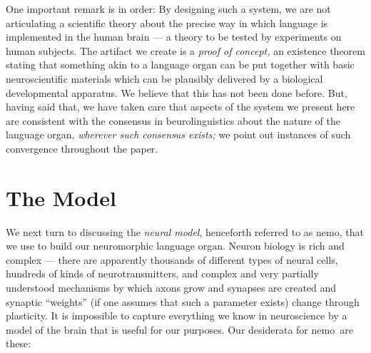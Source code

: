 \documentclass{article}
\begin{document}
One important remark is in order:  By designing such a system, we are not articulating a scientific theory about the precise way in which language is implemented in the human brain --- a theory to be tested by experiments on human subjects.  The artifact we create is a \emph{proof of concept,} an existence theorem stating that something akin to a language organ can be put together with basic neuroscientific materials which can be plausibly delivered by a biological developmental apparatus.  We believe that this has not been done before.  But, having said that, we have taken care that aspects of the system we present here are consistent with the consensus in beurolinguistics about the nature of the language organ, \emph{wherever such consensus exists;}  we point out instances of such convergence throughout the paper.

\def\name{{\sc nemo}}
\section{The Model}
We next turn to discussing the \emph{neural model}, henceforth referred to as \name, that we use to build our neuromorphic language organ.   Neuron biology \citep{Kandel} is rich and complex --- there are apparently thousands of different types of neural cells, hundreds of kinds of neurotransmitters, and complex and very partially understood mechanisms by which axons grow and synapses are created and synaptic ``weights'' (if one assumes that such a parameter exists) change through plasticity. It is impossible to capture everything we know in neuroscience by a model of the brain that is useful for our purposes. Our desiderata for \name\ are these:  
\end{document}
